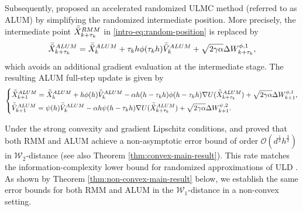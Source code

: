 \documentclass[12pt]{article}
\numberwithin{equation}{section}
\begin{document}
Subsequently, \cite{hu2021optimal} proposed an accelerated randomized ULMC method (referred to as ALUM) by simplifying the randomized intermediate position. More precisely, the intermediate point $\Bar{\Bar{X}}_{k+\tau_k}^{RMM}$ in \eqref{intro-eq:random-position} is replaced by
\begin{equation}
\label{intro-eq:random-position-1}
\Bar{\Bar{X}}_{k+\tau_k}^{ALUM}
=
\Bar{\Bar{X}}_k^{ALUM}
+
\tau_k h
\phi(\tau_k h)
\Bar{\Bar{V}}_{k}^{ALUM}
+
\sqrt{2\gamma\alpha}
\Delta W_{k+\tau_k}^{\phi,1},
\end{equation}
which avoids an additional gradient evaluation at the intermediate stage. The resulting ALUM full-step update is given by
\begin{equation}
\label{eq:intro-ALUM}
\left\{
\begin{aligned}
&
\Bar{\Bar{X}}_{k+1}^{ALUM}
    =
    \Bar{\Bar{X}}_{k}^{ALUM}
    +
    h\phi(h)\Bar{\Bar{V}}_{k}^{ALUM}
    - 
   \alpha
  h
  (h-\tau_k h )
  \phi(h-\tau_k h)
    \nabla U(\Bar{\Bar{X}}_{k+\tau_k}^{ALUM})
    +
    \sqrt{2\gamma\alpha}
    \Delta W_{k+1}^{\phi,1},  \\
    &
    \Bar{\Bar{V}}_{k+1}^{ALUM}
    =
    \psi(h)
    \Bar{\Bar{V}}_{k}^{ALUM}
    -
    \alpha h
    \psi(h-\tau_k h)
    \nabla U(\Bar{\Bar{X}}_{k+\tau_k}^{ALUM}) 
    +
    \sqrt{2\gamma\alpha}
    \Delta W_{k+1}^{\psi,2}.
\end{aligned}
\right.
\end{equation}




Under the strong convexity and gradient Lipschitz conditions,
\cite{shen2019randomized,yu2024langevin} and
\cite{hu2021optimal} proved that both RMM and
ALUM achieve a non-asymptotic error bound of order
$\mathcal O(d^{\frac12}h^{\frac32})$ in $\mathcal W_2$-distance (see also Theorem \ref{thm:convex-main-result}). This rate matches the
information-complexity lower bound for randomized approximations
of ULD \cite{cao2020complexity}. As shown by Theorem \ref{thm:non-convex-main-result} below, we establish the same error bounds for both RMM and ALUM in the $\mathcal W_1$-distance in a non-convex setting.
\end{document}
